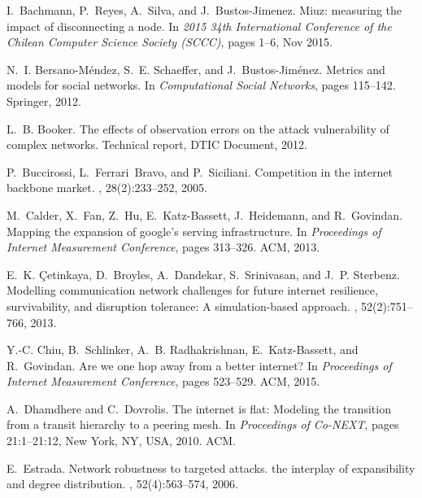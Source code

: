 \documentclass{sig-alternate-10pt}
\begin{document}
\begin{thebibliography}{10}

I.~Bachmann, P.~Reyes, A.~Silva, and J.~Bustos-Jimenez.
\newblock Miuz: measuring the impact of disconnecting a node.
\newblock In {\em 2015 34th International Conference of the Chilean Computer
  Science Society (SCCC)}, pages 1--6, Nov 2015.

N.~I. Bersano-M{\'e}ndez, S.~E. Schaeffer, and J.~Bustos-Jim{\'e}nez.
\newblock Metrics and models for social networks.
\newblock In {\em Computational Social Networks}, pages 115--142. Springer,
  2012.

L.~B. Booker.
\newblock The effects of observation errors on the attack vulnerability of
  complex networks.
\newblock Technical report, DTIC Document, 2012.

P.~Buccirossi, L.~Ferrari~Bravo, and P.~Siciliani.
\newblock Competition in the internet backbone market.
, 28(2):233--252, 2005.

M.~Calder, X.~Fan, Z.~Hu, E.~Katz-Bassett, J.~Heidemann, and R.~Govindan.
\newblock Mapping the expansion of google's serving infrastructure.
\newblock In {\em Proceedings of Internet Measurement Conference}, pages
  313--326. ACM, 2013.

E.~K. {\c{C}}etinkaya, D.~Broyles, A.~Dandekar, S.~Srinivasan, and J.~P.
  Sterbenz.
\newblock Modelling communication network challenges for future internet
  resilience, survivability, and disruption tolerance: A simulation-based
  approach.
, 52(2):751--766, 2013.

Y.-C. Chiu, B.~Schlinker, A.~B. Radhakrishnan, E.~Katz-Bassett, and
  R.~Govindan.
\newblock Are we one hop away from a better internet?
\newblock In {\em Proceedings of Internet Measurement Conference}, pages
  523--529. ACM, 2015.

A.~Dhamdhere and C.~Dovrolis.
\newblock The internet is flat: Modeling the transition from a transit
  hierarchy to a peering mesh.
\newblock In {\em Proceedings of Co-NEXT}, pages 21:1--21:12, New York, NY,
  USA, 2010. ACM.

E.~Estrada.
\newblock Network robustness to targeted attacks. the interplay of
  expansibility and degree distribution.
, 52(4):563--574, 2006.


\end{thebibliography}
\end{document}
